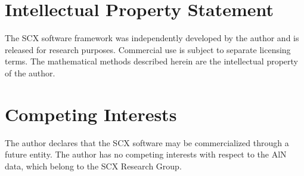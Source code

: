 \documentclass[twoside,prb,aps,floatfix,superscriptaddress,longbibliography]{revtex4-2}
\begin{document}
\section*{Intellectual Property Statement}
The SCX software framework was independently developed by the author and is released  for research purposes. Commercial use is subject to separate licensing terms. The mathematical methods described herein are the intellectual property of the author.

\section*{Competing Interests}
The author declares that the SCX software may be commercialized through a future entity. The author has no competing interests with respect to the AlN data, which belong to the SCX Research Group.
\end{document}
